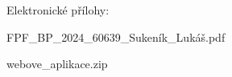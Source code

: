 \documentclass{vdocdiplcz}
\begin{document}
\maketitlepages

\tableofcontents\clearpage

\nastavodstavec   %
\radkovani   %

\mainmatter









\renewcommand{\refname}{Seznam použité literatury}

\begingroup

\endgroup

%
\listoffigures\clearpage
%
\listoftables\clearpage






\clearpage
%
\clearpage
%
\appendix
%

  \rule{0pt}{1pt}\thispagestyle{empty}
    \par
    \noindent{\Huge\bfseries\scshape\appendixpagename}
    \vspace{7em}
    

\begin{citemize}
	\item Elektronické přílohy:
	\begin{citemize}
		\item FPF\_BP\_2024\_60639\_Sukeník\_Lukáš.pdf
		\item webove\_aplikace.zip
	\end{citemize}
\end{citemize}
    \rule{0pt}{1pt}

  \clearpage

%
\end{document}
